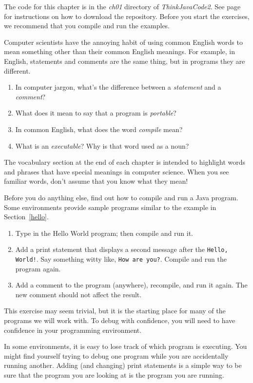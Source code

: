 The code for this chapter is in the {\it ch01} directory of {\it ThinkJavaCode2}.
See page~\pageref{code} for instructions on how to download the repository.
Before you start the exercises, we recommend that you compile and run the examples.


\begin{exercise}  %

Computer scientists have the annoying habit of using common English words to mean something other than their common English meanings.
For example, in English, statements and comments are the same thing, but in programs they are different.

\begin{enumerate}
\item In computer jargon, what's the difference between a {\em statement} and a {\em comment}?
\item What does it mean to say that a program is {\em portable}?
\item In common English, what does the word {\em compile} mean?
\item What is an {\em executable}? Why is that word used as a noun?
\end{enumerate}

The vocabulary section at the end of each chapter is intended to highlight words and phrases that have special meanings in computer science.
When you see familiar words, don't assume that you know what they mean!

\end{exercise}


\begin{exercise}  %

Before you do anything else, find out how to compile and run a Java program.
Some environments provide sample programs similar to the example in Section~\ref{hello}.

\begin{enumerate}
\item Type in the Hello World program; then compile and run it.

\item Add a print statement that displays a second message after the {\tt Hello, World!}.
Say something witty like, {\tt How are you?}.
Compile and run the program again.

\item Add a comment to the program (anywhere), recompile, and run it again.
The new comment should not affect the result.
\end{enumerate}

This exercise may seem trivial, but it is the starting place for many of the programs we will work with.
To debug with confidence, you will need to have confidence in your programming environment.

In some environments, it is easy to lose track of which program is executing.
You might find yourself trying to debug one program while you are accidentally running another.
Adding (and changing) print statements is a simple way to be sure that the program you are looking at is the program you are running.

\end{exercise}



